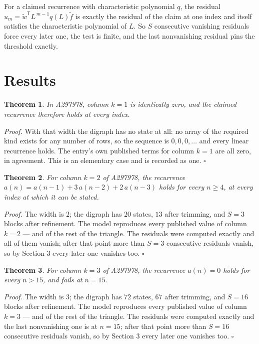 \documentclass[11pt]{article}
\newtheorem{theorem}{Theorem}
\theoremstyle{definition}
\begin{document}
For a claimed recurrence with characteristic polynomial $q$, the residual $u_m = \tilde w^{\mathsf T}L^{\,m-1}q(L)\tilde f$ is exactly the residual of the claim at one index and itself satisfies the characteristic polynomial of $L$. So $S$ consecutive vanishing residuals force every later one, the test is finite, and the last nonvanishing residual pins the threshold exactly.

\section{Results}

\begin{theorem} In A297978, column $k = 1$ is identically zero, and the claimed recurrence therefore holds at every index.\end{theorem}

{\itshape Proof.} With that width the digraph has no state at all: no array of the required kind exists for any number of rows, so the sequence is $0,0,0,\dots$ and every linear recurrence holds. The entry's own published terms for column $k = 1$ are all zero, in agreement. This is an elementary case and is recorded as one. $\square$

\begin{theorem} For column $k = 2$ of A297978, the recurrence $a(n) = a(n-1) + 3\,a(n-2) + 2\,a(n-3)$ holds for every $n \ge 4$, at every index at which it can be stated.\end{theorem}

{\itshape Proof.} The width is $2$; the digraph has $20$ states, $13$ after trimming, and $S = 3$ blocks after refinement. The model reproduces every published value of column $k = 2$ --- and of the rest of the triangle. The residuals were computed exactly and all of them vanish; after that point more than $S = 3$ consecutive residuals vanish, so by Section 3 every later one vanishes too. $\square$

\begin{theorem} For column $k = 3$ of A297978, the recurrence $a(n) = 0$ holds for every $n > 15$, and fails at $n = 15$.\end{theorem}

{\itshape Proof.} The width is $3$; the digraph has $72$ states, $67$ after trimming, and $S = 16$ blocks after refinement. The model reproduces every published value of column $k = 3$ --- and of the rest of the triangle. The residuals were computed exactly and the last nonvanishing one is at $n = 15$; after that point more than $S = 16$ consecutive residuals vanish, so by Section 3 every later one vanishes too. $\square$
\end{document}

